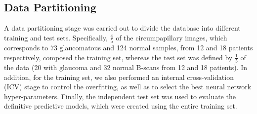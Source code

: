 \subsection{Data Partitioning} \label{subsec: Data_partitioning}
A data partitioning stage was carried out to divide the database into different training and test sets. Specifically, $\frac{4}{5}$ of the circumpapillary images, which corresponds to 73 glaucomatous and 124 normal samples, from 12 and 18 patients respectively, composed the training set, whereas the test set was defined by $\frac{1}{5}$ of the data (20 with glaucoma and 32 normal B-scans from 12 and 18 patients). In addition, for the training set, we also performed an internal cross-validation (ICV) stage to control the overfitting, as well as to select the best neural network hyper-parameters. Finally, the independent test set was used to evaluate the definitive predictive models, which were created using the entire training set. 

